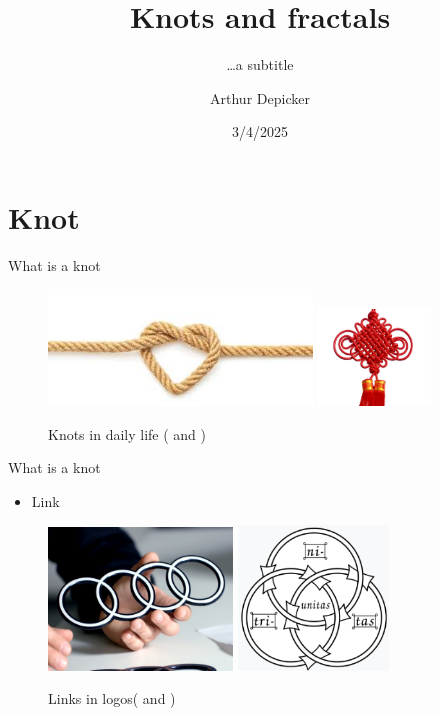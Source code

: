 \documentclass[]{beamer}
\title[Main title]{Knots and fractals}
\subtitle{\ldots a subtitle}
\author[A.\ Depicker]{Arthur Depicker} %
\date{3/4/2025} %
\institute[KU Leuven]{Faculty of Science\\ Department of Earth and Environmental Sciences}
\begin{document}
	{
		\maketitle
	}
	\addtocounter{framenumber}{-1} %

\section{Knot}
\begin{frame}{What is a knot}
\begin{figure}
\centering
\includegraphics[width=7cm]{Pictures/images.jpg}
\includegraphics[width=3cm]{Pictures/chineseknot.png}
\caption{Knots in daily life (\cite{Knotsdailylife} and \cite{Chineseknot})}
    \label{fig:enter-label}
\end{figure}
\end{frame}

\begin{frame}{What is a knot}
    \begin{itemize}
        \item Link
    \end{itemize}
\begin{figure}
\centering
\includegraphics[width = 4.9cm]{Pictures/audi.jpg}
\includegraphics[width = 4cm]{Pictures/borromean.png}
    \caption{Links in logos(\cite{audi} and \cite{christiantrequetra})}
    \label{fig:enter-label}
\end{figure}


\end{frame}
\end{document}

